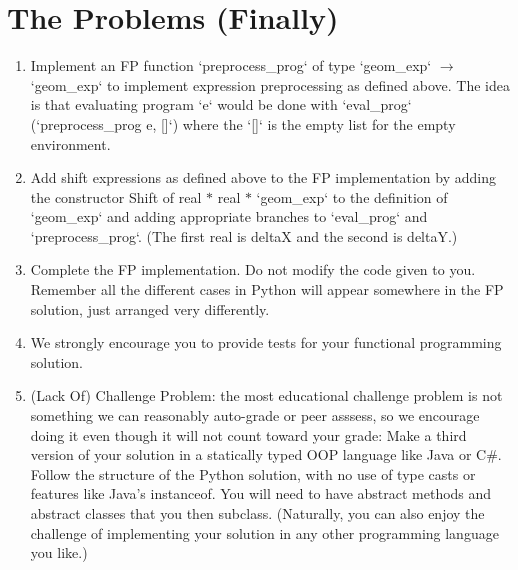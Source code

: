 \documentclass[a4paper,12pt]{article}
\begin{document}
\section*{The Problems (Finally)}
\begin{enumerate}
  \item Implement an FP function `preprocess\_prog` of type `geom\_exp` $\rightarrow$ `geom\_exp` to implement expression preprocessing as defined above. The idea is that evaluating program `e` would be done with `eval\_prog` (`preprocess\_prog e, []`) where the `[]` is the empty list for the empty environment.

  \item Add shift expressions as defined above to the FP implementation by adding the constructor Shift of real $*$ real $*$ `geom\_exp` to the definition of `geom\_exp` and adding appropriate branches to `eval\_prog` and `preprocess\_prog`. (The first real is deltaX and the second is deltaY.)

  \item Complete the FP implementation. Do not modify the code given to you. Remember all the different cases in Python will appear somewhere in the FP solution, just arranged very differently.

  \item We strongly encourage you to provide tests for your functional programming solution.

  \item (Lack Of) Challenge Problem: the most educational challenge problem is not something we can reasonably auto-grade or peer asssess, so we encourage doing it even though it will not count toward your grade: Make a third version of your solution in a statically typed OOP language like Java or C\#. Follow the structure of the Python solution, with no use of type casts or features like Java's instanceof. You will need to have abstract methods and abstract classes that you then subclass. (Naturally, you can also enjoy the challenge of implementing your solution in any other programming language you like.)
\end{enumerate}
\end{document}
